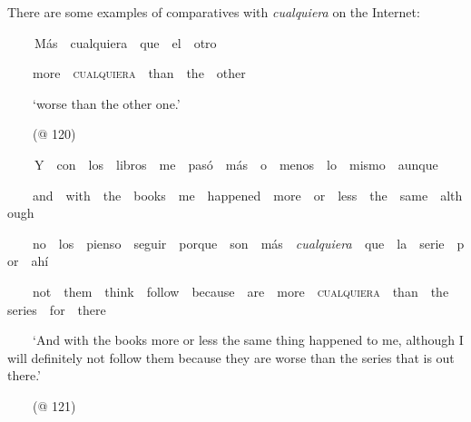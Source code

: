 \begin{styleStandard}
There are some examples of comparatives with \textit{cualquiera} on the Internet:
\end{styleStandard}

\begin{styleStandard}
\textbf{\ \ }\ \ Más\ \ cualquiera\ \ que\ \ el\ \ otro\ \ \ \ \ \ \ \ \ \ 
\end{styleStandard}

\begin{styleStandard}
\ \ \ \ more\ \ \textsc{cualquiera}\ \ than\ \ the\ \ other\ \ \ \ \ \ \ \ \ \ 
\end{styleStandard}

\begin{styleStandard}
\ \ \ \ ‘worse than the other one.’
\end{styleStandard}

\begin{styleStandard}
\ \ \ \ (@ 120)
\end{styleStandard}

\begin{styleStandard}
\textbf{\ \ }\ \ Y\ \ con\ \ los\ \ libros\ \ me\ \ pasó\ \ más\ \ o\ \ menos\ \ lo\ \ mismo\ \ aunque
\end{styleStandard}

\begin{styleStandard}
\ \ \ \ and\ \ with\ \ the\ \ books\ \ me\ \ happened\ \ more\ \ or\ \ less\ \ the\ \ same\ \ although
\end{styleStandard}

\begin{styleStandard}
\ \ \ \ no\ \ los\ \ pienso\ \ seguir\ \ porque\ \ son\ \ más\ \ \textit{cualquiera\ \ }que\ \ la\ \ serie\ \ por\ \ ahí
\end{styleStandard}

\begin{styleStandard}
\ \ \ \ not\ \ them\ \ think\ \ follow\ \ because\ \ are\ \ more\ \ \textsc{cualquiera}\ \ than\ \ the\ \ series\ \ for\ \ there
\end{styleStandard}

\begin{styleStandard}
\ \ \ \ ‘And with the books more or less the same thing happened to me, although I will definitely not follow them because they are worse\textit{ }than the series that is out there.’
\end{styleStandard}

\begin{styleStandard}
\ \ \ \ (@ 121)
\end{styleStandard}

